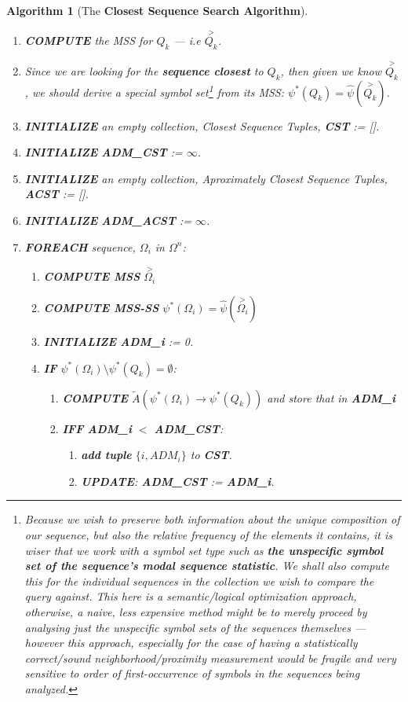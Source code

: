 \documentclass[a4paper, 18pt]{book} %
\newtheorem{alg}{Algorithm}
\begin{document}
\vspace{1em}
\begin{alg}[The \textbf{Closest Sequence Search Algorithm}]
\label{ALGCSA}
$ $\\
\begin{enumerate}
\item \textbf{COMPUTE} the MSS for $Q_k$ --- i.e $\overset{>}{Q_k}$.
\item Since we are looking for the \textbf{sequence closest} to $Q_k$, then given we know $\overset{>}{Q_k}$, we should derive a special symbol set\footnote{Because we wish to preserve both information about the unique composition of our sequence, but also the relative frequency of the elements it contains, it is wiser that we work with a symbol set type such as \textbf{the unspecific symbol set of the sequence's modal sequence statistic}. We shall also compute this for the individual sequences in the collection we wish to compare the query against. This here is a semantic/logical optimization approach, otherwise, a naive, less expensive method might be to merely proceed by analysing just the unspecific symbol sets of the sequences themselves --- however this approach, especially for the case of having a statistically correct/sound neighborhood/proximity measurement would be fragile and very sensitive to order of first-occurrence of symbols in the sequences being analyzed.} from its MSS: $\psi^*(Q_k) = \hat{\psi}(\overset{>}{Q_k})$.
\item \textbf{INITIALIZE} an empty collection, Closest Sequence Tuples, \textbf{CST} := [].
\item \textbf{INITIALIZE} \textbf{ADM\_CST} := $\infty$.
\item \textbf{INITIALIZE}  an empty collection,  Aproximately Closest Sequence Tuples, \textbf{ACST} := [].
\item \textbf{INITIALIZE} \textbf{ADM\_ACST} := $\infty$.
\item {\textbf{FOREACH} sequence, $\Omega_i$ in $\Omega^n$: 
	\begin{enumerate}
	\item \textbf{COMPUTE MSS} $\overset{>}{\Omega_i}$
	\item \textbf{COMPUTE MSS-SS} $\psi^*(\Omega_i) = \hat{\psi}(\overset{>}{\Omega_i})$
	\item \textbf{INITIALIZE} \textbf{ADM\_i} := 0.
	\item{\textbf{IF} $\psi^*(\Omega_i) \setminus \psi^*(Q_k) = \emptyset$: 
		\begin{enumerate}
			\item \textbf{COMPUTE} $\tilde{A}(\psi^*(\Omega_i) \rightarrow \psi^*(Q_k))$ and store that in \textbf{ADM\_i}
			\item{ \textbf{IFF} \textbf{ADM\_i} $<$ \textbf{ADM\_CST}: 
			\begin{enumerate}
			\item \textbf{add tuple} $\{i, ADM_i\}$ to \textbf{CST}.
			\item \textbf{UPDATE}: \textbf{ADM\_CST} := \textbf{ADM\_i}.
			\end{enumerate}
			
}
\end{enumerate}}
\end{enumerate}}
\end{enumerate}
\end{alg}
\end{document}
